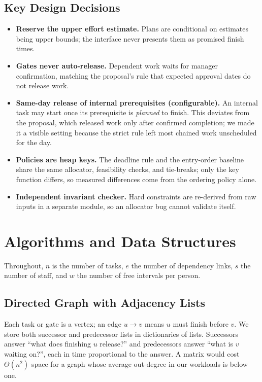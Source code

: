 \documentclass[sigconf,nonacm]{acmart}
\begin{document}
\subsection{Key Design Decisions}
\begin{itemize}
\item \textbf{Reserve the upper effort estimate.} Plans are conditional on estimates being
  upper bounds; the interface never presents them as promised finish times.
\item \textbf{Gates never auto-release.} Dependent work waits for manager confirmation,
  matching the proposal's rule that expected approval dates do not release work.
\item \textbf{Same-day release of internal prerequisites (configurable).} An internal task
  may start once its prerequisite is \emph{planned} to finish. This deviates from the
  proposal, which released work only after confirmed completion; we made it a visible
  setting because the strict rule left most chained work unscheduled for the day.
\item \textbf{Policies are heap keys.} The deadline rule and the entry-order baseline share
  the same allocator, feasibility checks, and tie-breaks; only the key function differs,
  so measured differences come from the ordering policy alone.
\item \textbf{Independent invariant checker.} Hard constraints are re-derived from raw inputs
  in a separate module, so an allocator bug cannot validate itself.
\end{itemize}

\section{Algorithms and Data Structures}
Throughout, $n$ is the number of tasks, $e$ the number of dependency links, $s$ the number
of staff, and $w$ the number of free intervals per person.

\subsection{Directed Graph with Adjacency Lists}
Each task or gate is a vertex; an edge $u \to v$ means $u$ must finish before $v$. We store
both successor and predecessor lists in dictionaries of lists. Successors answer ``what does
finishing $u$ release?'' and predecessors answer ``what is $v$ waiting on?'', each in time
proportional to the answer. A matrix would cost $\Theta(n^2)$ space for a graph whose
average out-degree in our workloads is below one.
\end{document}
